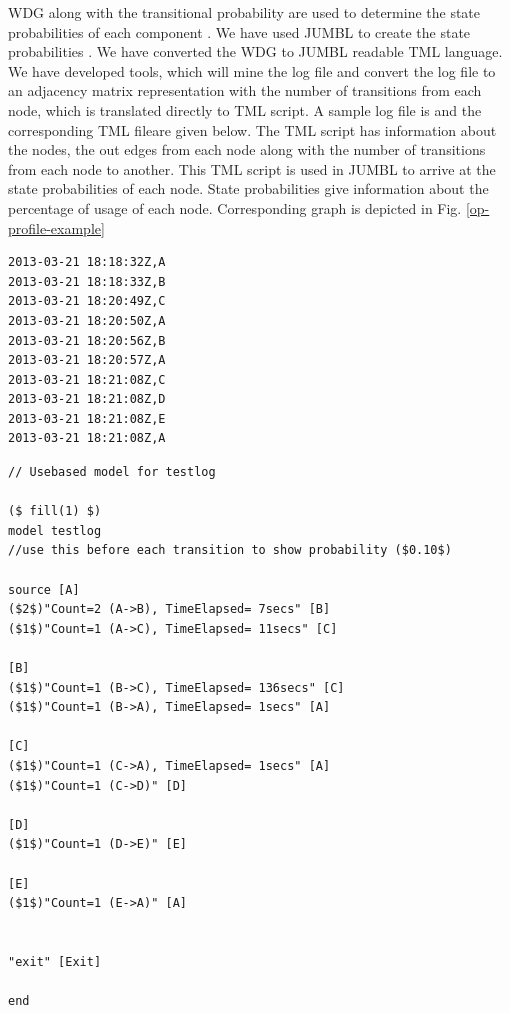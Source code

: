 WDG along with the transitional probability are used to determine the state probabilities of each component . We have used JUMBL to create the state probabilities \cite{anil}. We have converted the WDG to JUMBL readable TML \cite{tug} language. We have developed tools, which will mine the log file and convert the log file to an adjacency matrix representation with the number of transitions from each node, which is translated directly to TML script. A sample log file is and the corresponding TML fileare given below. The TML script has information about the nodes, the out edges from each node along with the number of transitions from each node to another. This TML script is used in JUMBL to arrive at the state probabilities of each node. State probabilities give information about the percentage of usage of each node. Corresponding graph is depicted in Fig. \ref{op-profile-example}



\begin{verbatim}
2013-03-21 18:18:32Z,A
2013-03-21 18:18:33Z,B
2013-03-21 18:20:49Z,C
2013-03-21 18:20:50Z,A
2013-03-21 18:20:56Z,B
2013-03-21 18:20:57Z,A
2013-03-21 18:21:08Z,C
2013-03-21 18:21:08Z,D
2013-03-21 18:21:08Z,E
2013-03-21 18:21:08Z,A
\end{verbatim}


\begin{verbatim}
// Usebased model for testlog

($ fill(1) $)
model testlog
//use this before each transition to show probability ($0.10$)

source [A]
($2$)"Count=2 (A->B), TimeElapsed= 7secs" [B]
($1$)"Count=1 (A->C), TimeElapsed= 11secs" [C]

[B]
($1$)"Count=1 (B->C), TimeElapsed= 136secs" [C]
($1$)"Count=1 (B->A), TimeElapsed= 1secs" [A]

[C]
($1$)"Count=1 (C->A), TimeElapsed= 1secs" [A]
($1$)"Count=1 (C->D)" [D]

[D]
($1$)"Count=1 (D->E)" [E]

[E]
($1$)"Count=1 (E->A)" [A]


"exit" [Exit]

end 
\end{verbatim}



